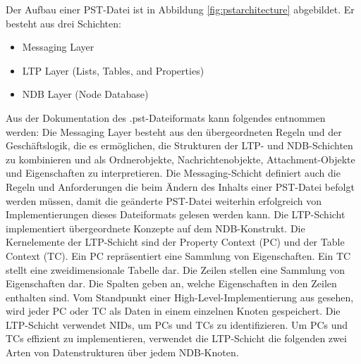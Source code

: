Der Aufbau einer PST-Datei ist in Abbildung \ref{fig:pstarchitecture} abgebildet. Er besteht aus drei Schichten:

\begin{itemize}
    \item Messaging Layer
    \item LTP Layer (Lists, Tables, and Properties)
    \item NDB Layer (Node Database)

\end{itemize}

Aus der Dokumentation des .pst-Dateiformats kann folgendes entnommen werden: \newline
Die Messaging Layer besteht aus den übergeordneten Regeln und der Geschäftslogik, die es ermöglichen, die Strukturen der LTP- und NDB-Schichten zu kombinieren und als Ordnerobjekte, Nachrichtenobjekte, Attachment-Objekte und Eigenschaften zu interpretieren. Die Messaging-Schicht definiert auch die Regeln und Anforderungen die beim Ändern des Inhalts einer PST-Datei befolgt werden müssen, damit die geänderte PST-Datei weiterhin erfolgreich von Implementierungen dieses Dateiformats gelesen werden kann. \newline
Die LTP-Schicht implementiert übergeordnete Konzepte auf dem NDB-Konstrukt. Die Kernelemente der LTP-Schicht sind der Property Context (PC) und der Table Context (TC). Ein PC repräsentiert eine Sammlung von Eigenschaften. Ein TC stellt eine zweidimensionale Tabelle dar. Die Zeilen stellen eine Sammlung von Eigenschaften dar. Die Spalten geben an, welche Eigenschaften in den Zeilen enthalten sind.
Vom Standpunkt einer High-Level-Implementierung aus gesehen, wird jeder PC oder TC als Daten in einem einzelnen Knoten gespeichert. Die LTP-Schicht verwendet NIDs, um PCs und TCs zu identifizieren.\newline
Um PCs und TCs effizient zu implementieren, verwendet die LTP-Schicht die folgenden zwei Arten von Datenstrukturen über jedem NDB-Knoten.
